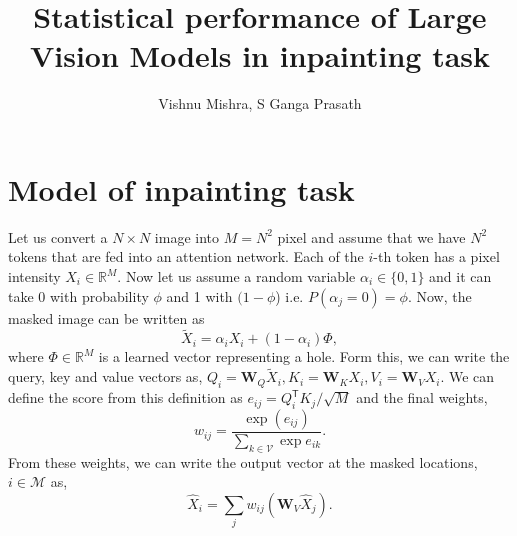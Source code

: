 \documentclass[11pt]{article}
\title{Statistical performance of Large Vision Models in inpainting task}
\author{Vishnu Mishra, S Ganga Prasath}
\date{}
\def\R{\mathbb{R}}
\def\Xt{\tilde{X}}
\def\Xh{\hat{X}}
\def\T{\mathsf{T}}
\def\W{\mathbf{W}}
\def\V{\mathcal{V}}
\def\M{\mathcal{M}}
\begin{document}
\maketitle

\section{Model of inpainting task}
Let us convert a $N \times N$ image into $M = N^2$ pixel and assume that we have $N^2$ tokens that are fed into an attention network. Each of the $i$-th token has a pixel intensity $X_i \in \R^M$. Now let us assume a random variable $\alpha_i \in \{ 0, 1 \}$ and it can take 0 with probability $\phi$ and 1 with $(1-\phi$) i.e. $P(\alpha_j = 0) = \phi$. Now, the masked image can be written as
\[
\Xt_i = \alpha_i X_i + (1-\alpha_i) \Phi,
\]
where $\Phi \in \R^M$ is a learned vector representing a hole. Form this, we can write the query, key and value vectors as, $Q_i = \W_Q \Xt_i, K_i = \W_K X_i, V_i = \W_V X_i$. We can define the score from this definition as $e_{ij} = Q_i^\T K_j/\sqrt{M}$ and the final weights,
\[
w_{ij} = \frac{\exp (e_{ij})}{\sum_{k \in \V} \exp{e_{ik}}}.
\]
From these weights, we can write the output vector at the masked locations, $i \in \M$ as,
\[
\Xh_i = \sum_j w_{ij} (\W_V \Xh_j).
\]
\end{document}
